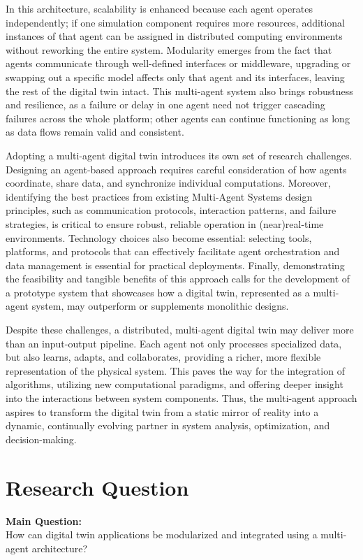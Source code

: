 In this architecture, scalability is enhanced because each agent operates independently; if one simulation component requires more resources, additional instances of that agent can be assigned in distributed computing environments without reworking the entire system. Modularity emerges from the fact that agents communicate through well-defined interfaces or middleware, upgrading or swapping out a specific model affects only that agent and its interfaces, leaving the rest of the digital twin intact. This multi-agent system also brings robustness and resilience, as a failure or delay in one agent need not trigger cascading failures across the whole platform; other agents can continue functioning as long as data flows remain valid and consistent.

Adopting a multi-agent digital twin introduces its own set of research challenges. Designing an agent-based approach requires careful consideration of how agents coordinate, share data, and synchronize individual computations. Moreover, identifying the best practices from existing Multi-Agent Systems design principles, such as communication protocols, interaction patterns, and failure strategies, is critical to ensure robust, reliable operation in (near)real-time environments. Technology choices also become essential: selecting tools, platforms, and protocols that can effectively facilitate agent orchestration and data management is essential for practical deployments. Finally, demonstrating the feasibility and tangible benefits of this approach calls for the development of a prototype system that showcases how a digital twin, represented as a multi-agent system, may outperform or supplements monolithic designs.


Despite these challenges, a distributed, multi-agent digital twin may deliver more than an input-output pipeline. Each agent not only processes specialized data, but also learns, adapts, and collaborates, providing a richer, more flexible representation of the physical system. This paves the way for the integration of algorithms, utilizing new computational paradigms, and offering deeper insight into the interactions between system components. Thus, the multi-agent approach aspires to transform the digital twin from a static mirror of reality into a dynamic, continually evolving partner in system analysis, optimization, and decision-making.


\section*{Research Question}
\textbf{Main Question:}\\
How can digital twin applications be modularized and integrated using a multi-agent architecture?

